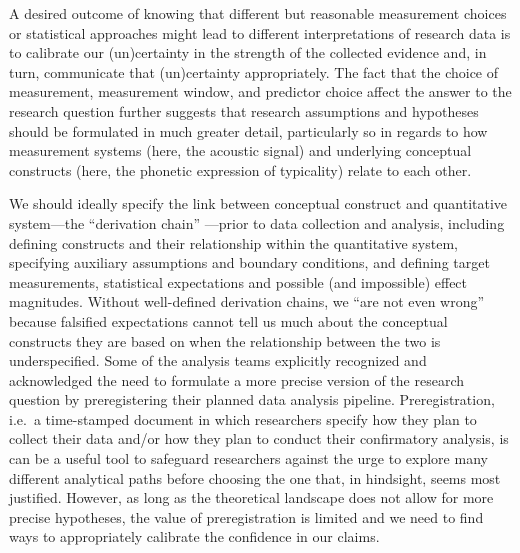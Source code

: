 \documentclass[Review,times,sageh]{sagej}
\begin{document}
A desired outcome of knowing that different but reasonable measurement choices or statistical approaches might lead to different interpretations of research data is to calibrate our (un)certainty in the strength of the collected evidence and, in turn, communicate that (un)certainty appropriately.
The fact that the choice of measurement, measurement window, and predictor choice affect the answer to the research question further suggests that research assumptions and hypotheses should be formulated in much greater detail, particularly so in regards to how measurement systems (here, the acoustic signal) and underlying conceptual constructs (here, the phonetic expression of typicality) relate to each other.

We should ideally specify the link between conceptual construct and quantitative system---the ``derivation chain'' \citep{dubin1970theory, meehl1990summaries}---prior to data collection and analysis, including defining constructs and their relationship within the quantitative system, specifying auxiliary assumptions and boundary conditions, and defining target measurements, statistical expectations and possible (and impossible) effect magnitudes.
Without well-defined derivation chains, we ``are not even wrong'' \citep{scheel2022most} because falsified expectations cannot tell us much about the conceptual constructs they are based on when the relationship between the two is underspecified.
Some of the analysis teams explicitly recognized and acknowledged the need to formulate a more precise version of the research question by preregistering their planned data analysis pipeline.
Preregistration, i.e.~a time-stamped document in which researchers specify how they plan to collect their data and/or how they plan to conduct their confirmatory analysis, is can be a useful tool to safeguard researchers against the urge to explore many different analytical paths before choosing the one that, in hindsight, seems most justified.
However, as long as the theoretical landscape does not allow for more precise hypotheses, the value of preregistration is limited and we need to find ways to appropriately calibrate the confidence in our claims.
\end{document}
